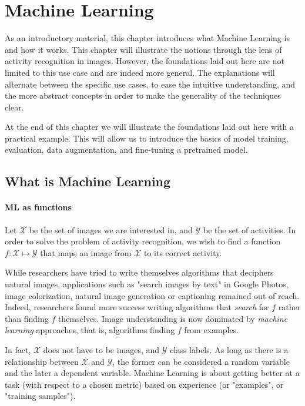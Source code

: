 \chapter{Machine Learning}

As an introductory material, this chapter introduces what Machine Learning is and how it works. This chapter will illustrate the notions through the lens of activity recognition in images. However, the foundations laid out here are not limited to this use case and are indeed more general. The explanations will alternate between the specific use cases, to ease the intuitive understanding, and the more abstract concepts in order to make the generality of the techniques clear.

At the end of this chapter we will illustrate the foundations laid out here with a practical example. This will allow us to introduce the basics of model training, evaluation, data augmentation, and fine-tuning a pretrained model.

\section{What is Machine Learning}

\subsubsection{ML as functions}

Let $\mathcal{X}$ be the set of  images we are interested in, and $\mathcal{Y}$ be the set of activities. In order to solve the problem of activity recognition, we wish to find a function $f:\mathcal{X}\mapsto\mathcal{Y}$ that maps an image from $\mathcal{X}$ to its correct activity. 

While researchers have tried to write themselves algorithms that deciphers natural images, applications such as "search images by text" in Google Photos, image colorization, natural image generation or captioning remained out of reach. Indeed, researchers found more success writing algorithms that \emph{search} for $f$ rather than finding $f$ themselves. Image understanding is now dominated by \emph{machine learning} approaches, that is, algorithms finding $f$ from examples.

In fact, $\mathcal{X}$ does not have to be images, and $\mathcal{Y}$ class labels. As long as there is a relationship between $\mathcal{X}$ and $\mathcal{Y}$, the former can be considered a random variable and the later a dependent variable. Machine Learning is about getting better at a task (with respect to a chosen metric) based on experience (or "examples", or "training samples").

